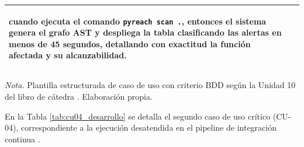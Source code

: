 \begin{table}[H]
\begin{tabularx}{\textwidth}{>{\bfseries\raggedright\arraybackslash}p{4.2cm} X}
\textbf{cuando} ejecuta el comando \texttt{pyreach scan .}, \newline
\textbf{entonces} el sistema genera el grafo AST y despliega la tabla clasificando las alertas en menos de 45 segundos, detallando con exactitud la función afectada y su alcanzabilidad. \\ %
\bottomrule
\end{tabularx}
\vspace{2pt}
\begin{flushleft}
\scriptsize \textit{Nota.} Plantilla estructurada de caso de uso con criterio BDD según la Unidad 10 del libro de cátedra \parencite{torres2026proyecto}. Elaboración propia. %
\end{flushleft}
\end{table}

En la Tabla \ref{tab:cu04_desarrollo} se detalla el segundo caso de uso crítico (CU-04), correspondiente a la ejecución desatendida en el pipeline de integración continua \parencite{torres2026proyecto}. %

